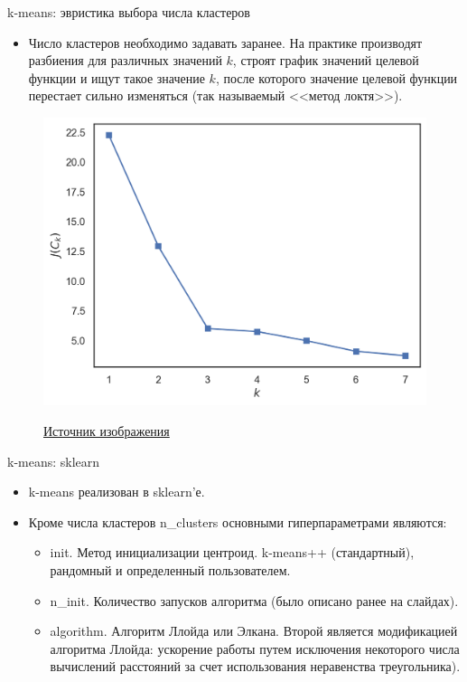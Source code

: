 \documentclass{beamer}
\begin{document}
\begin{frame}{k-means: эвристика выбора числа кластеров}
    \small
    
    \begin{itemize}
        \item Число кластеров необходимо задавать заранее. На практике производят разбиения для различных значений $k$, строят график значений целевой функции и ищут такое значение $k$, после которого значение целевой функции перестает сильно изменяться (так называемый <<метод локтя>>).
    \end{itemize}
    
    \begin{figure}
        \centering
        \includegraphics[width=0.6\linewidth]{elbow_method.png}
        
        \href{https://mlcourse.ai/book/topic07/topic7_pca_clustering.html
}{Источник изображения}
    \end{figure}
\end{frame}

\begin{frame}{k-means: sklearn}
    \small

    \begin{itemize}
        \item k-means реализован в sklearn'е.
        \item Кроме числа кластеров n\_clusters основными гиперпараметрами являются:
        \begin{itemize}
            \item init. Метод инициализации центроид. k-means++ (стандартный), рандомный и определенный пользователем.
            \item n\_init. Количество запусков алгоритма (было описано ранее на слайдах).
            \item algorithm. Алгоритм Ллойда или Элкана. Второй является модификацией алгоритма Ллойда: ускорение работы путем исключения некоторого числа вычислений расстояний за счет использования неравенства треугольника).
        \end{itemize}       
    \end{itemize}
\end{frame}
\end{document}
